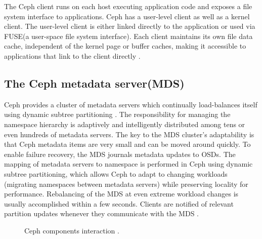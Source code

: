 \documentclass[9pt,twocolumn,twoside]{../../styles/osajnl}
\begin{document}
The Ceph client runs on each host executing application code and
exposes a file system interface to applications. Ceph has a user-level
client as well as a kernel client. The user-level client is either
linked directly to the application or used via FUSE(a user-space file
system interface). Each client maintains its own file data cache,
independent of the kernel page or buffer caches, making it accessible
to applications that link to the client directly \cite{paper-Ceph}.
\subsection{The Ceph metadata server(MDS)}
Ceph provides a cluster of metadata servers which continually
load-balances itself using dynamic subtree partitioning
\cite{ceph-metadata}. The responsibility for managing the namespace
hierarchy is adaptively and intelligently distributed among tens or
even hundreds of metadata servers. The key to the MDS cluster’s
adaptability is that Ceph metadata items are very small and can be
moved around quickly. To enable failure recovery, the MDS journals
metadata updates to OSDs. The mapping of metadata servers to namespace
is performed in Ceph using dynamic subtree partitioning, which allows
Ceph to adapt to changing workloads (migrating namespaces between
metadata servers) while preserving locality for
performance. Rebalancing of the MDS at even extreme workload changes
is usually accomplished within a few seconds. Clients are notified of
relevant partition updates whenever they communicate with the MDS
\cite{www-ibm-ceph}.

\begin{figure}[htbp]
\centering
{}
\caption{Ceph components interaction \cite{paper-ceph-hadoop}.}
\label{CCI}
\end{figure}
\end{document}
